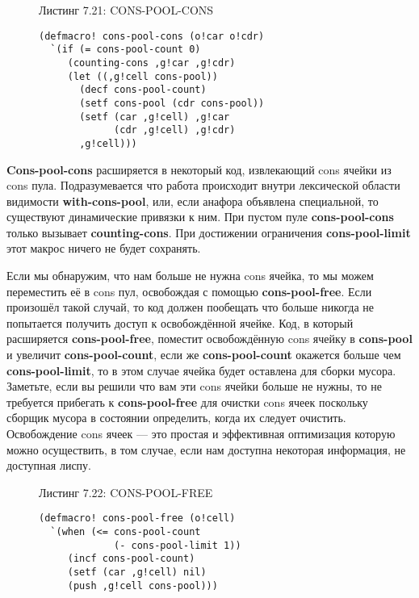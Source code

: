 \begin{figure}Листинг 7.21: CONS-POOL-CONS\label{listing_7.21}
\listbegin
\begin{verbatim}
(defmacro! cons-pool-cons (o!car o!cdr)
  `(if (= cons-pool-count 0)
     (counting-cons ,g!car ,g!cdr)
     (let ((,g!cell cons-pool))
       (decf cons-pool-count)
       (setf cons-pool (cdr cons-pool))
       (setf (car ,g!cell) ,g!car
             (cdr ,g!cell) ,g!cdr)
       ,g!cell)))
\end{verbatim}
\listend
\end{figure}

\textbf{Cons-pool-cons} расширяется в некоторый код, извлекающий cons ячейки из cons пула. Подразумевается что работа происходит внутри лексической области видимости \textbf{with-cons-pool}, или, если анафора объявлена специальной, то существуют динамические привязки к ним. При пустом пуле \textbf{cons-pool-cons} только вызывает \textbf{counting-cons}. При достижении ограничения \textbf{cons-pool-limit} этот макрос ничего не будет сохранять.

Если мы обнаружим, что нам больше не нужна cons ячейка, то мы можем переместить её в cons пул, освобождая с помощью \textbf{cons-pool-free}. Если произошёл такой случай, то код должен пообещать что больше никогда не попытается получить доступ к освобождённой ячейке. Код, в который расширяется \textbf{cons-pool-free}, поместит освобождённую cons ячейку в \textbf{cons-pool} и увеличит \textbf{cons-pool-count}, если же \textbf{cons-pool-count} окажется больше чем \textbf{cons-pool-limit}, то в этом случае ячейка будет оставлена для сборки мусора. Заметьте, если вы решили что вам эти cons ячейки больше не нужны, то не требуется прибегать к \textbf{cons-pool-free} для очистки cons ячеек поскольку сборщик мусора в состоянии определить, когда их следует очистить. Освобождение cons ячеек --- это простая и эффективная оптимизация которую можно осуществить, в том случае, если нам доступна некоторая информация, не доступная лиспу.

\begin{figure}Листинг 7.22: CONS-POOL-FREE\label{listing_7.22}
\listbegin
\begin{verbatim}
(defmacro! cons-pool-free (o!cell)
  `(when (<= cons-pool-count
             (- cons-pool-limit 1))
     (incf cons-pool-count)
     (setf (car ,g!cell) nil)
     (push ,g!cell cons-pool)))
\end{verbatim}
\listend
\end{figure}

